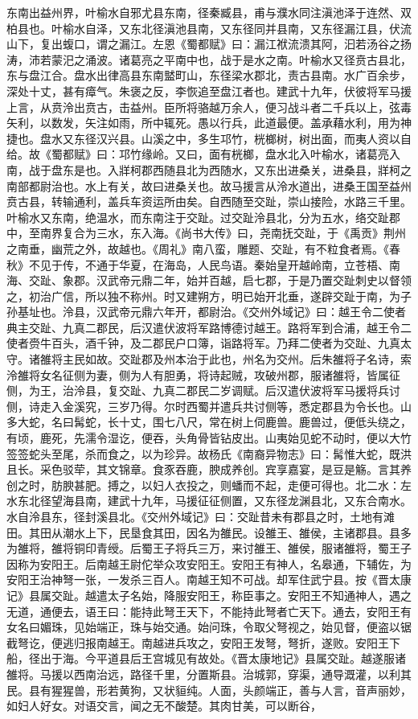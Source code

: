 \documentclass[12pt,UTF8]{ctexbook}
\begin{document}
东南出益州界，叶榆水自邪尤县东南，径秦臧县，甫与濮水同注滇池泽于连然、双柏县也。叶榆水自泽，又东北径滇池县南，又东径同并县南，又东径漏江县，伏流山下，复出蝮口，谓之漏江。左恩《蜀都赋》曰：漏江袱流溃其阿，汩若汤谷之扬涛，沛若蒙汜之涌波。诸葛亮之平南中也，战于是水之南。叶榆水又径贲古县北，东与盘江合。盘水出律高县东南盢町山，东径梁水郡北，责古县南。水广百余步，深处十丈，甚有瘴气。朱褒之反，李恢追至盘江者也。建武十九年，伏彼将军马援上言，从贲泠出贲古，击益州。臣所将骆越万余人，便习战斗者二千兵以上，弦毒矢利，以数发，矢注如雨，所中辄死。愚以行兵，此道最便。盖承藉水利，用为神捷也。盘水又东径汉兴县。山溪之中，多生邛竹，桄榔树，树出面，而夷人资以自给。故《蜀都赋》曰：邛竹缘岭。又曰，面有桄榔，盘水北入叶榆水，诸葛亮入南，战于盘东是也。入牂柯郡西随县北为西随水，又东出进桑关，进桑县，牂柯之南部都尉治也。水上有关，故曰进桑关也。故马援言从泠水道出，进桑王国至益州贲古县，转输通利，盖兵车资运所由矣。自西随至交趾，崇山接险，水路三千里。叶榆水又东南，绝温水，而东南注于交趾。过交趾泠县北，分为五水，络交趾郡中，至南界复合为三水，东入海。《尚书大传》曰，尧南抚交趾，于《禹贡》荆州之南垂，幽荒之外，故越也。《周礼》南八蛮，雕题、交趾，有不粒食者焉。《春秋》不见于传，不通于华夏，在海岛，人民鸟语。秦始皇开越岭南，立苍梧、南海、交趾、象郡。汉武帝元鼎二年，始并百越，启七郡，于是乃置交趾刺史以督领之，初治广信，所以独不称州。时又建朔方，明已始开北垂，遂辟交趾于南，为子孙基址也。泠县，汉武帝元鼎六年开，都尉治。《交州外域记》曰：越王令二使者典主交趾、九真二郡民，后汉遣伏波将军路博德讨越王。路将军到合浦，越王令二使者赍牛百头，酒千钟，及二郡民户口簿，诣路将军。乃拜二使者为交趾、九真太守。诸雒将主民如故。交趾郡及州本治于此也，州名为交州。后朱雒将子名诗，索泠雒将女名征侧为妻，侧为人有胆勇，将诗起贼，攻破州郡，服诸雒将，皆属征侧，为王，治泠县，复交趾、九真二郡民二岁调赋。后汉遣伏波将军马援将兵讨侧，诗走入金溪究，三岁乃得。尔时西蜀并遣兵共讨侧等，悉定郡县为令长也。山多大蛇，名曰髯蛇，长十丈，围七八尺，常在树上伺鹿兽。鹿兽过，便低头绕之，有顷，鹿死，先濡令湿讫，便吞，头角骨皆钻皮出。山夷始见蛇不动时，便以大竹签签蛇头至尾，杀而食之，以为珍异。故杨氏《南裔异物志》曰：髯惟大蛇，既洪且长。采色驳荦，其文锦章。食豕吞鹿，腴成养创。宾享嘉宴，是豆是觞。言其养创之时，肪腴甚肥。搏之，以妇人衣投之，则蟠而不起，走便可得也。北二水：左水东北径望海县南，建武十九年，马援征征侧置，又东径龙渊县北，又东合南水。水自泠县东，径封溪县北。《交州外域记》曰：交趾昔未有郡县之时，土地有滩田。其田从潮水上下，民垦食其田，因名为雒民。设雒王、雒侯，主诸郡县。县多为雒将，雒将铜印青绶。后蜀王子将兵三万，来讨雒王、雒侯，服诸雒将，蜀王子因称为安阳王。后南越王尉佗举众攻安阳王。安阳王有神人，名皋通，下辅佐，为安阳王治神弩一张，一发杀三百人。南越王知不可战。却军住武宁县。按《晋太康记》县属交趾。越遣太子名始，降服安阳王，称臣事之。安阳王不知通神人，遇之无道，通便去，语王曰：能持此弩王天下，不能持此弩者亡天下。通去，安阳王有女名曰媚珠，见始端正，珠与始交通。始问珠，令取父弩视之，始见督，便盗以锯截弩讫，便逃归报南越王。南越进兵攻之，安阳王发弩，弩折，遂败。安阳王下船，径出于海。今平道县后王宫城见有故处。《晋太康地记》县属交趾。越遂服诸雒将。马援以西南治远，路径千里，分置斯县。治城郭，穿渠，通导溉灌，以利其民。县有猩猩兽，形若黄狗，又状貆纯。人面，头颜端正，善与人言，音声丽妙，如妇人好女。对语交言，闻之无不酸楚。其肉甘美，可以断谷，
\end{document}
